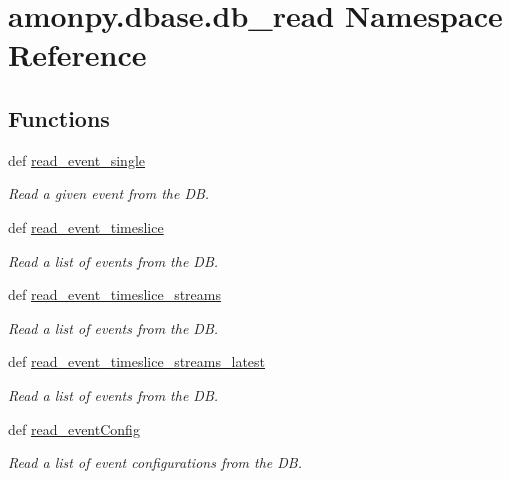\hypertarget{namespaceamonpy_1_1dbase_1_1db__read}{\section{amonpy.\-dbase.\-db\-\_\-read Namespace Reference}
\label{namespaceamonpy_1_1dbase_1_1db__read}
}
\subsection*{Functions}
\begin{DoxyCompactItemize}
\item 
def \hyperlink{namespaceamonpy_1_1dbase_1_1db__read_aadfa918c61f17617c45347f988f99d40}{read\-\_\-event\-\_\-single}
\begin{DoxyCompactList}\small\item\em Read a given event from the D\-B. \end{DoxyCompactList}\item 
def \hyperlink{namespaceamonpy_1_1dbase_1_1db__read_a87534985aa3a945c03ef031a3001b6fb}{read\-\_\-event\-\_\-timeslice}
\begin{DoxyCompactList}\small\item\em Read a list of events from the D\-B. \end{DoxyCompactList}\item 
def \hyperlink{namespaceamonpy_1_1dbase_1_1db__read_a70f32a72bc370d0c49e1c37a9dee7400}{read\-\_\-event\-\_\-timeslice\-\_\-streams}
\begin{DoxyCompactList}\small\item\em Read a list of events from the D\-B. \end{DoxyCompactList}\item 
def \hyperlink{namespaceamonpy_1_1dbase_1_1db__read_abf5b3ee552eafecb11b0ad175a95ceea}{read\-\_\-event\-\_\-timeslice\-\_\-streams\-\_\-latest}
\begin{DoxyCompactList}\small\item\em Read a list of events from the D\-B. \end{DoxyCompactList}\item 
def \hyperlink{namespaceamonpy_1_1dbase_1_1db__read_add5550ef892288fab9ad494852474746}{read\-\_\-event\-Config}
\begin{DoxyCompactList}\small\item\em Read a list of event configurations from the D\-B. \end{DoxyCompactList}\item 

\end{DoxyCompactItemize}
